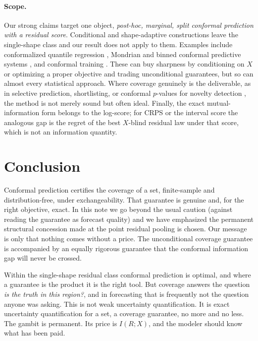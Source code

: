 \documentclass[11pt]{article}
\theoremstyle{definition}
\begin{document}
\paragraph{Scope.} Our strong claims target one object, \emph{post-hoc, marginal, split
conformal prediction with a residual score}. Conditional and shape-adaptive constructions
leave the single-shape class and our result does not apply to them. Examples include
conformalized quantile regression \citep{romano2019conformalized}, Mondrian and binned
conformal predictive systems \citep{bostrom2021mondrian,toccaceli2026crps}, and conformal
training \citep{stutz2022learning}. These can buy sharpness by conditioning on $X$ or
optimizing a proper objective and trading unconditional guarantees, but so can almost every
statistical approach. Where coverage genuinely is the deliverable, as in selective
prediction, shortlisting, or conformal $p$-values for novelty detection
\citep{angelopoulos2021uncertainty,bates2021distribution}, the method is not merely sound
but often ideal. Finally, the exact mutual-information form belongs to the log-score; for
CRPS or the interval score the analogous gap is the regret of the best $X$-blind residual
law under that score, which is not an information quantity.

\section{Conclusion}

Conformal prediction certifies the coverage of a set, finite-sample and distribution-free,
under exchangeability. That guarantee is genuine and, for the right objective, exact. In
this note we go beyond the usual caution (against reading the guarantee as forecast quality)
and we have emphasized the permanent structural concession made at the point residual
pooling is chosen. Our message is only that nothing comes without a price. The unconditional
coverage guarantee is accompanied by an equally rigorous guarantee that the conformal
information gap will never be crossed.

Within the single-shape residual class conformal prediction is optimal, and where a
guarantee is the product it is the right tool. But coverage answers the question \emph{is
the truth in this region?}, and in forecasting that is frequently not the question anyone was
asking. This is not weak uncertainty quantification. It is exact uncertainty quantification
for a set, a coverage guarantee, no more and no less. The gambit is permanent. Its price is
$I(R;X)$, and the modeler should know what has been paid.



\end{document}
